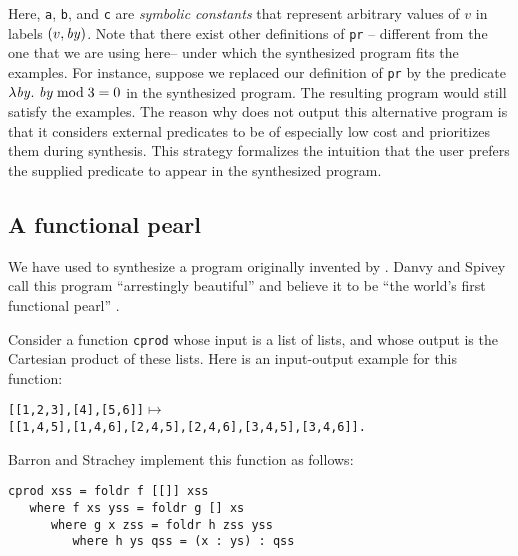 Here,
{\tt a}, {\tt b}, and {\tt c} are {\em symbolic constants} that
represent arbitrary values of $v$ in labels $(v, \mathit{by})$. Note that there exist other 
definitions of {\tt pr} -- different from the one
that we are using here-- under which the synthesized program fits the
examples. For instance, suppose we replaced our definition of {\tt pr}
by the predicate $\lambda \mathit{by}.\ \mathit{by} \bmod 3 = 0$ in the
synthesized program. The resulting program would still satisfy the
examples. The reason why \sys does not output this alternative program
is that it considers external predicates to be of especially low cost and 
prioritizes them during synthesis.  This strategy formalizes the intuition
that the user prefers the supplied predicate to appear in the synthesized program.



\subsection{A functional pearl}

We have used \sys to  synthesize a program originally invented by
\cite{barron-strachey}.  Danvy and Spivey  call this program
``arrestingly beautiful'' and believe it to be ``the world's first
functional pearl'' \cite{spivey-example}.

Consider a function \verb+cprod+ whose input is a list of lists, and
whose output is the Cartesian product of these lists. Here is an
input-output example for this function:

{\footnotesize
\begin{alltt}
[[1,2,3], [4], [5,6]] \(\mapsto\) 
 [[1,4,5],[1,4,6],[2,4,5],[2,4,6],[3,4,5],[3,4,6]].
\end{alltt}
}

Barron and Strachey  implement this function as follows\cite{barron-strachey}: 
\lstset{language=Haskell}
\begin{lstlisting}
cprod xss = foldr f [[]] xss
   where f xs yss = foldr g [] xs
      where g x zss = foldr h zss yss
         where h ys qss = (x : ys) : qss
\end{lstlisting}

